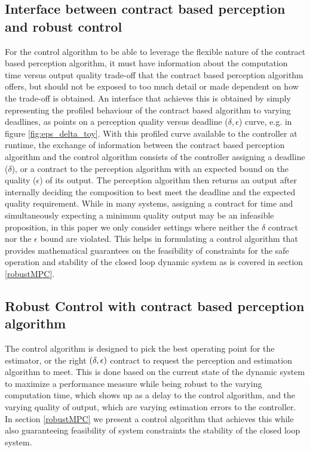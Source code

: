

\subsection{Interface between contract based perception and robust control}

For the control algorithm to be able to leverage the flexible nature of the contract based perception algorithm, it must have information about the computation time versus output quality trade-off that the contract based perception algorithm offers, but should not be exposed to too much detail or made dependent on how the trade-off is obtained. An interface that achieves this is obtained by simply representing the profiled behaviour of the contract based algorithm to varying deadlines, as points on a perception quality versus deadline ($\delta, \epsilon$) curve, e.g. in figure \ref{fig:eps_delta_toy}.
With this profiled curve available to the controller at runtime, the exchange of information between the contract based perception algorithm and the control algorithm consists of the controller assigning a deadline ($\delta$), or a contract to the perception algorithm with an expected bound on the quality ($\epsilon$) of its output. The perception algorithm then returns an output after internally deciding the composition to best meet the deadline and the expected quality requirement. While in many systems, assigning a contract for time and simultaneously expecting a minimum quality output may be an infeasible proposition, in this paper we only consider settings where neither the $\delta$ contract nor the $\epsilon$ bound are violated. This helps in formulating a control algorithm that provides mathematical guarantees on the feasibility of constraints for the safe operation and stability of the closed loop dynamic system as is covered in section \ref{robustMPC}.

\subsection{Robust Control with contract based perception algorithm}

The control algorithm is designed to pick the best operating point for the estimator, or the right $(\delta,\epsilon)$ contract to request the perception and estimation algorithm to meet. This is done based on the current state of the dynamic system to maximize a performance measure while being robust to the varying computation time, which shows up as a delay to the control algorithm, and the varying quality of output, which are varying estimation errors to the controller. In section \ref{robustMPC} we present a control algorithm that achieves this while also guaranteeing feasibility of system constraints the stability of the closed loop system.






